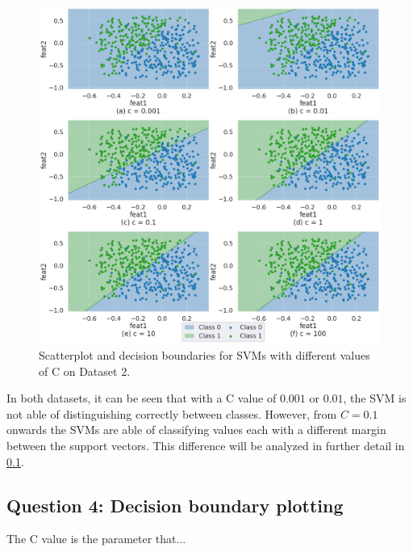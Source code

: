\documentclass{article}
\begin{document}
\begin{figure}[tb]
    \centering
    \includegraphics[width=\linewidth]{Img/Q1/Q1_3_SVM2.png}
    \caption{Scatterplot and decision boundaries for SVMs with different values of C on Dataset 2.}
    \label{fig:Q1_3_SVM2}
\end{figure}

In both datasets, it can be seen that with a C value of $0.001$ or $0.01$, the SVM is not able of distinguishing correctly between classes. However, from $C=0.1$ onwards the SVMs are able of classifying values each with a different margin between the support vectors. This difference will be analyzed in further detail in \ref{subsec:Q1_4}.

\subsection{Question 4: Decision boundary plotting}
\label{subsec:Q1_4}
The C value is the parameter that...
\end{document}
